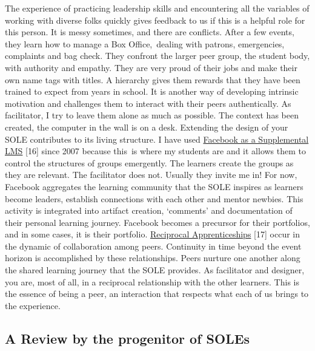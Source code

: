 The experience of practicing leadership skills and encountering all the
variables of working with diverse folks quickly gives feedback to us if
this is a helpful role for this person. It is messy sometimes, and there
are conflicts. After a few events, they learn how to manage a Box
Office,~dealing with patrons, emergencies, complaints and bag check.
They confront the larger peer group, the student body, with authority
and empathy. They are very proud of their jobs and make their own name
tags with titles. A hierarchy gives them rewards that they have been
trained to expect from years in school. It is another way of developing
intrinsic motivation and challenges them to interact with their peers
authentically. As facilitator, I try to leave them alone as much as
possible. The context has been created, the computer in the wall is on a
desk. Extending the design of your SOLE contributes to its living
structure. I have used
\href{http://community.telecentre.org/profiles/blogs/facebook-as-a-supplemental-lms}{Facebook
as a Supplemental LMS} {[}16{]} since 2007 because this~is where my
students are and it allows them to control the structures of groups
emergently. The learners create the groups as they are relevant. The
facilitator does not. Usually they invite me in! For now, Facebook
aggregates the learning community that the SOLE inspires as learners
become leaders, establish connections with each other and mentor
newbies. This activity is integrated into artifact creation, `comments'
and documentation of their personal learning journey. Facebook becomes a
precursor for their portfolios, and in some cases, it is their
portfolio.
\href{http://starwars.wikia.com/wiki/Reciprocal_apprenticeship}{Reciprocal
Apprenticeships} {[}17{]} occur in the dynamic of collaboration among
peers. Continuity in time beyond the event horizon is accomplished by
these relationships. Peers nurture one another along the shared learning
journey that the SOLE provides. As facilitator and designer, you are,
most of all, in a reciprocal relationship with the other learners. This
is the essence of being a peer, an interaction that respects what each
of us brings to the experience.

\subsection{A Review by the progenitor of SOLEs}

